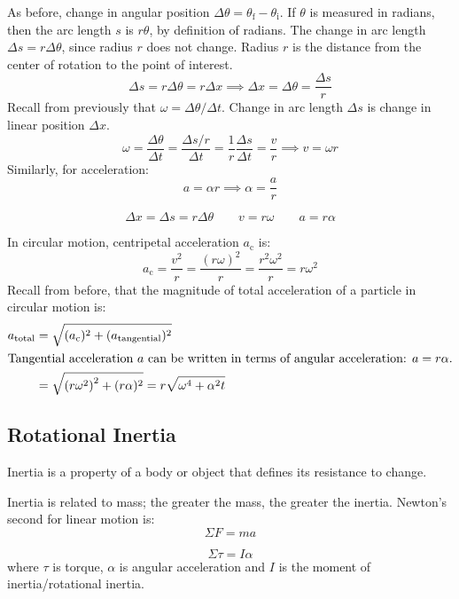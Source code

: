 \documentclass{article}
\newcommand{\definition}[1]{\begin{tcolorbox}[colback=red!5!white,colframe=red!75!black,parbox=false] #1 \end{tcolorbox}}
\newcommand{\theorem}[2]{\begin{tcolorbox}[title={#1},colback=blue!5!white,colframe=blue!75!black,parbox=false] #2 \end{tcolorbox}}
\begin{document}
As before, change in angular position $\Delta \theta=\theta_ \text{f}- \theta_ \text{i}$. If $\theta$ is measured in radians, then the arc length $s$ is $r\theta$, by definition of radians. The change in arc length $\Delta s=r\Delta \theta$, since radius $r$ does not change. Radius $r$ is the distance from the center of rotation to the point of interest.
\begin{equation*}
    \Delta s=r\Delta \theta=r\Delta x
	\implies \Delta x=\Delta \theta=\frac{\Delta s}{r}
\end{equation*}
Recall from previously that $\omega=\Delta \theta/\Delta t$. Change in arc length $\Delta s$ is change in linear position $\Delta x$.
\begin{equation*}
    \omega
	=\frac{\Delta \theta}{\Delta t}
	=\frac{\Delta s/r}{\Delta t}
	=\frac 1r \frac{\Delta s}{\Delta t}
	=\frac{v}{r}
	\implies v=\omega r
\end{equation*}
Similarly, for acceleration:
\begin{equation*}
    a=\alpha r
	\implies 
	\alpha=\frac{a}{r}
\end{equation*}
\theorem{Connection between rotational and linear quantities}{
	\begin{equation*}
		\Delta x=\Delta s=r\Delta \theta
		\qquad
		v=r \omega 
		\qquad
		a=r \alpha
	\end{equation*}
}
In circular motion, centripetal acceleration $a_ \text{c}$ is:
\begin{equation*}
    a_ \text{c}
	=\frac{v^2}{r}
	=\frac{(r\omega)^2}{r}
	=\frac{r^2\omega^2}{r}
	=r\omega^2
\end{equation*}
Recall from before, that the magnitude of total acceleration of a particle in circular motion is:
\begin{align*}
	a_ \text{total}
	&=\sqrt{(a_\text{c})^2+(a_ \text{tangential})^2} \\
	\intertext{Tangential acceleration $a$ can be written in terms of angular acceleration: $a=r\alpha$.}
	&=\sqrt{\left( r\omega^2 \right)^2+(r\alpha)^2}
	=r \sqrt{\omega^4+\alpha^2t}
\end{align*}

\subsection{Rotational Inertia}

\definition{Inertia is a property of a body or object that defines its resistance to change.}

Inertia is related to mass; the greater the mass, the greater the inertia. Newton's second for linear motion is:
\begin{equation*}
    \Sigma F=ma
\end{equation*}
\theorem{Newton's second law for rotation}{
	\begin{equation*}
	    \Sigma \tau=I \alpha
	\end{equation*}
	where $\tau$ is torque, $\alpha$ is angular acceleration and $I$ is the moment of inertia/rotational inertia.
}
\end{document}
